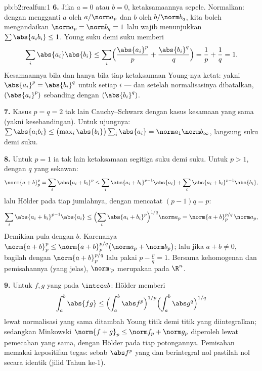 \begin{solution}{pb:b2:realfun:1}
\textbf{6.} Jika $a = 0$ atau $b = 0$, ketaksamaannya sepele.
Normalkan: dengan mengganti $a$ oleh $a/\norm a_p$ dan $b$ oleh $b/\norm
b_q$, kita boleh mengandaikan $\norm a_p = \norm b_q = 1$ lalu wajib
menunjukkan $\sum\abs{a_ib_i} \leq 1$. Young suku demi suku memberi
\[
\sum_i\abs{a_i}\abs{b_i} \leq
\sum_i\Bigl(\frac{\abs{a_i}^p}{p} +
\frac{\abs{b_i}^q}{q}\Bigr) = \frac1p + \frac1q = 1 .
\]
Kesamaannya bila dan hanya bila tiap ketaksamaan Young-nya ketat: yakni
$\abs{a_i}^p = \abs{b_i}^q$ untuk setiap $i$ --- dan setelah
normalisasinya dibatalkan, $(\abs{a_i}^p)$ sebanding dengan $(\abs{b_i}^q)$.

\textbf{7.} Kasus $p = q = 2$ tak lain Cauchy--Schwarz dengan
kasus kesamaan yang sama (yakni kesebandingan). Untuk ujungnya:
$\sum\abs{a_ib_i} \leq \bigl(\max_i\abs{b_i}\bigr)\sum_i\abs{a_i} =
\norm a_1\norm b_\infty$, langsung suku demi suku.

\textbf{8.} Untuk $p = 1$ ia tak lain ketaksamaan segitiga suku demi
suku. Untuk $p > 1$, dengan $q$ yang sekawan:
\[
\norm{a+b}_p^p = \sum_i\abs{a_i + b_i}^p
\leq \sum_i\abs{a_i+b_i}^{p-1}\abs{a_i} +
\sum_i\abs{a_i+b_i}^{p-1}\abs{b_i},
\]
lalu Hölder pada tiap jumlahnya, dengan mencatat $(p - 1)q = p$:
\[
\sum_i\abs{a_i+b_i}^{p-1}\abs{a_i} \leq
\Bigl(\sum_i\abs{a_i+b_i}^{p}\Bigr)^{1/q}\norm a_p
= \norm{a + b}_p^{p/q}\,\norm a_p ,
\]
Demikian pula dengan $b$. Karenanya $\norm{a+b}_p^p \leq \norm{a +
b}_p^{p/q}\bigl(\norm a_p +
\norm b_p\bigr)$; lalu jika $a + b \neq 0$, bagilah dengan
$\norm{a+b}_p^{p/q}$ lalu pakai $p - \frac pq = 1$. Bersama
kehomogenan dan pemisahannya (yang jelas), $\norm\cdot_p$ merupakan
 pada $\R^n$.

\textbf{9.} Untuk $f, g$ yang  pada $\intcc ab$: Hölder memberi
\[
\int_a^b\abs{fg} \leq \Bigl(\int_a^b\abs
f^p\Bigr)^{1/p}\Bigl(\int_a^b\abs g^q\Bigr)^{1/q}
\]
lewat normalisasi yang sama ditambah Young titik demi titik yang
diintegralkan; sedangkan Minkowski $\norm{f + g}_p \leq \norm f_p +
\norm g_p$ diperoleh lewat pemecahan yang sama, dengan Hölder pada tiap
potongannya. Pemisahan  memakai kepositifan tegas: sebab
$\abs f^p$ yang  dan berintegral nol pastilah nol secara identik
(jilid Tahun ke-1).


\end{solution}
